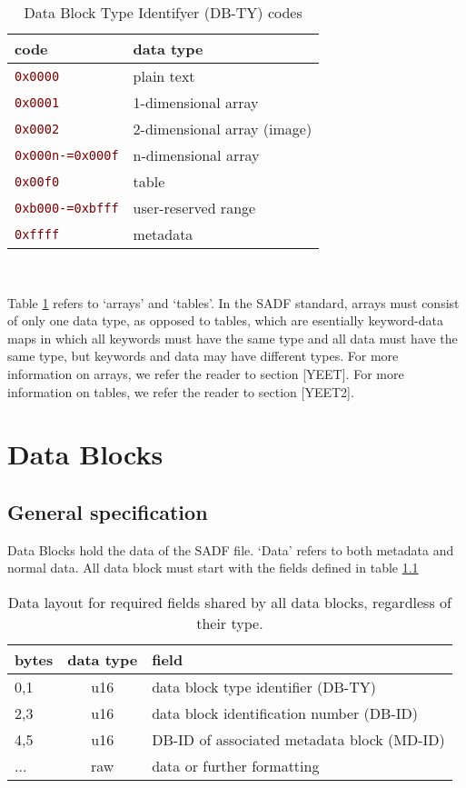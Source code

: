 \documentclass[pagesize=a4]{tufte-book}
\newcommand{\hlred}[1]{\textcolor{Maroon}{#1}}%
\newcommand{\hex}[1]{\hlred{\texttt{#1}}}%
\begin{document}
\begin{table}[ht]
	\centering
	\selectfont
	\begin{tabular}{ll}
		\toprule
		code & data type\\
		\midrule
		\hex{0x0000} & plain text\\
		\hex{0x0001} & 1-dimensional array\\
		\hex{0x0002} & 2-dimensional array (image)\\
		\hex{0x000n-=0x000f} & n-dimensional array\\
		\hex{0x00f0} & table\\
		\hex{0xb000-=0xbfff} & user-reserved range\\
		\hex{0xffff} & metadata\\
		\bottomrule
	\end{tabular}
	~\label{tab:data_block_type_codes}
	\caption{Data Block Type Identifyer (DB-TY) codes}
\end{table}
\vspace{5mm}

Table \ref{tab:data_block_type_codes} refers to `arrays' and `tables'. In the SADF standard, arrays must consist of only one data type, as opposed to tables, which are esentially keyword-data maps in which all keywords must have the same type and all data must have the same type, but keywords and data may have different types.
For more information on arrays, we refer the reader to section [YEET]. For more information on tables, we refer the reader to section [YEET2].

\chapter{Data Blocks}
\section{General specification}
\label{general_db_spec}
Data Blocks hold the data of the SADF file.  `Data' refers to both metadata and normal data. All data block must start with the fields defined in table \ref{tab:db_required_fields}

\begin{table}[ht]
	\centering
	\selectfont
	\begin{tabular}{lcl}
		\toprule
		bytes & data type & field\\
		\midrule
		0,1 & u16 & data block type identifier (DB-TY)\\
		2,3 & u16 & data block identification number (DB-ID)\\
		4,5 & u16 & DB-ID of associated metadata block (MD-ID)\\
		... & raw & data or further formatting\\
		\bottomrule
	\end{tabular}
	~\label{tab:db_required_fields}
	\caption{Data layout for required fields shared by all data blocks, regardless of their type.}	
\end{table}
\vspace{5mm}
\end{document}

